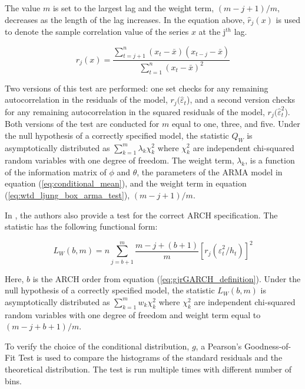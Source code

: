 \documentclass[12pt]{article}
\begin{document}
The value $m$ is set to the largest lag and the weight term, $(m - j + 1) / m$, decreases as the length of the lag increases. In the equation above, $\hat{r}_{j}(x)$ is used to denote the sample correlation value of the series $x$ at the j$^{th}$ lag.

\begin{equation} \label{eq:sample_correlation}
	r_{j}(x) = \frac{\sum_{t=j+1}^{n} (x_{t} - \bar{x}) (x_{t-j} - \bar{x})}{\sum_{t=1}^{n} (x_{t} - \bar{x})^{2}}
\end{equation}

Two versions of this test are performed: one set checks for any remaining autocorrelation in the residuals of the model, $r_{j}(\hat{\varepsilon}_{t}$), and a second version checks for any remaining autocorrelation in the squared residuals of the model, $r_{j}(\hat{\varepsilon}_{t}^{2}$). Both versions of the test are conducted for $m$ equal to one, three, and five. Under the null hypothesis of a correctly specified model, the statistic $Q_{W}$ is asymptotically distributed as $\sum_{k=1}^{m} \lambda_{k} \chi_{k}^{2}$ where $\chi_{k}^{2}$ are independent chi-squared random variables with one degree of freedom. The weight term, $\lambda_{k}$, is a function of the information matrix of $\phi$ and $\theta$, the parameters of the ARMA model in equation (\ref{eq:conditional_mean}), and the weight term in equation (\ref{eq:wtd_ljung_box_arma_test}), $(m - j + 1) / m$.

In \cite{Fisher_Gallagher_2012}, the authors also provide a test for the correct ARCH specification. The statistic has the following functional form:

\begin{equation}
	L_{W}(b,m) = n \sum_{j=b+1}^{m} \frac{m - j + (b + 1)}{m} [r_{j} \left( \hat{\varepsilon}_{t}^{2} / h_{t} \right)]^{2} 
\end{equation}

Here, $b$ is the ARCH order from equation (\ref{eq:gjrGARCH_definition}). Under the null hypothesis of a correctly specified model, the statistic $L_{W}(b,m)$ is asymptotically distributed as $\sum_{k=1}^{m} w_{k} \chi_{k}^{2}$ where $\chi_{k}^{2}$ are independent chi-squared random variables with one degree of freedom and weight term equal to $(m - j + b + 1) / m$.

To verify the choice of the conditional distribution, $g$, a Pearson's Goodness-of-Fit Test is used to compare the histograms of the standard residuals and the theoretical distribution. The test is run multiple times with different number of bins.
\end{document}
